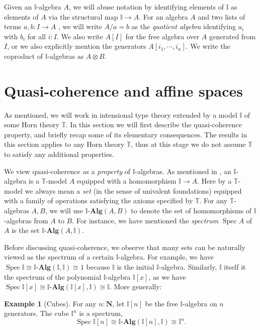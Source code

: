 \documentclass[12pt]{amsart}
\theoremstyle{definition}
\newtheorem{example}[theorem]{Example}
\newcommand{\mb}[1]{\mathbf{#1}}
\newcommand{\mbb}[1]{\mathbb{#1}}
\newcommand{\T}{\mbb T}
\newcommand{\I}{\mbb I}
\newcommand{\alg}{\text{-}\mb{Alg}}
\newcommand{\N}{\mb N}
\newcommand{\spec}{\operatorname{Spec}}
\begin{document}
Given an $\I$-algebra $A$, we will abuse notation by identifying elements of $\I$ as elements of $A$ via the structural map $\I \to A$. For an algebra $A$ and two lists of terms $a,b : I \to A$ , we will write $A/a = b$ as the \emph{quotient algebra} identifying $a_i$ with $b_i$ for all $i : I$. We also write $A[I]$ for the free algebra over $A$ generated from $I$, or we also explicitly mention the generators $A[i_1,\cdots,i_n]$. We write the coproduct of $\I$-algebras as $A \otimes B$.

\section{Quasi-coherence and affine spaces}\label{sec:basics}

As mentioned, we will work in intensional type theory extended by a model $\I$ of some Horn theory $\T$. In this section we will first describe the quasi-coherence property, and briefly recap some of its elementary consequences. The results in this section applies to any Horn theory $\T$, thus at this stage we do not assume $\T$ to satisfy any additional properties.

We view quasi-coherence as a \emph{property} of $\I$-algebras. As mentioned in , an $\I$-algebra is a $\T$-model $A$ equipped with a homomorphism $\I \to A$. Here by a $\T$-model we always mean a \emph{set} (in the sense of univalent foundations) equipped with a family of operations satisfying the axioms specified by $\T$. For any $\T$-algebras $A,B$, we will use $\I\alg(A,B)$ to denote the set of homomorphisms of $\I$-algebras from $A$ to $B$. For instance, we have mentioned the \emph{spectrum} $\spec A$ of $A$ is the set $\I\alg(A,\I)$. 

Before discussing quasi-coherence, we observe that many sets can be naturally viewed as the spectrum of a certain $\I$-algebra. For example, we have $\spec \I \cong \I\alg(\I,\I) \cong 1$ because  $\I$ is the initial $\I$-algebra. Similarly, $\I$ itself it the spectrum of the polynomial $\I$-algebra $\I[x]$, as we have $\spec \I[x] \cong \I\alg(\I[x],\I) \cong \I$. More generally:

\begin{example}[Cubes]\label{exm:cubeaffine}
  For any $n:\N$, let $\I[n]$ be the free $\I$-algebra on $n$ generators. The cube $\I^n$ is a spectrum,
  \[ \spec \I[n] \cong \I\alg(\I[n],\I) \cong \I^n. \]
\end{example}
\end{document}
